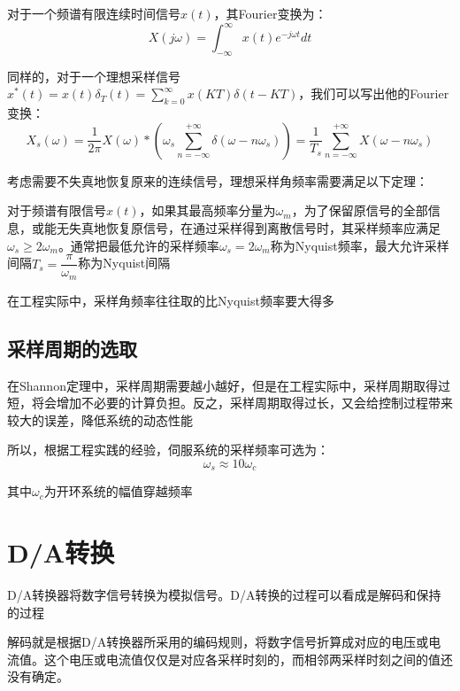 对于一个频谱有限连续时间信号$x(t)$，其Fourier变换为：
\begin{equation*}
    X(j\omega) = \int^\infty_{-\infty} x(t)e^{-j\omega t} dt
\end{equation*}

同样的，对于一个理想采样信号$x^* (t) = x(t) \delta_T(t) = \sum\limits_{k=0}^\infty x(KT) \delta(t-KT)$，我们可以写出他的Fourier变换：
\begin{equation*}
    X_s(\omega) = \frac{1}{2\pi} X(\omega)*(\omega_s \sum\limits_{n=-\infty}^{+\infty} \delta(\omega-n\omega_s)) = \frac{1}{T_s}\sum\limits_{n=-\infty}^{+\infty}X(\omega-n\omega_s)
\end{equation*}

考虑需要不失真地恢复原来的连续信号，理想采样角频率需要满足以下定理：

\begin{theorem}[Shannon定理]
    对于频谱有限信号$x(t)$，如果其最高频率分量为$\omega_m$，为了保留原信号的全部信息，或能无失真地恢复原信号，在通过采样得到离散信号时，其采样频率应满足$\omega_s\geq 2\omega_m$。通常把最低允许的采样频率$\omega_s = 2\omega_m$称为Nyquist频率，最大允许采样间隔$T_s = \dfrac{\pi}{\omega_m}$称为Nyquist间隔
\end{theorem}

在工程实际中，采样角频率往往取的比Nyquist频率要大得多

\subsection{采样周期的选取}

在Shannon定理中，采样周期需要越小越好，但是在工程实际中，采样周期取得过短，将会增加不必要的计算负担。反之，采样周期取得过长，又会给控制过程带来较大的误差，降低系统的动态性能

所以，根据工程实践的经验，伺服系统的采样频率可选为：
\begin{equation*}
    \omega_s \approx 10\omega_c
\end{equation*}

其中$\omega_c$为开环系统的幅值穿越频率


\section{D/A转换}
D/A转换器将数字信号转换为模拟信号。D/A转换的过程可以看成是解码和保持的过程

解码就是根据D/A转换器所采用的编码规则，将数字信号折算成对应的电压或电流值。这个电压或电流值仅仅是对应各采样时刻的，而相邻两采样时刻之间的值还没有确定。

